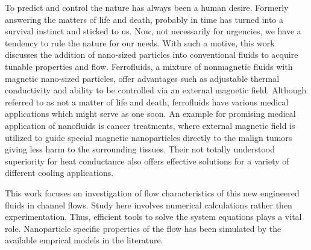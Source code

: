 
To predict and control the nature has always been a human desire. Formerly answering the matters of life and death, probably in time has turned into a survival instinct and sticked to us. Now, not necessarily for urgencies, we have a tendency to rule the nature for our needs. With such a motive, this work discusses the addition of nano-sized particles into conventional fluids to acquire tunable properties and flow. Ferrofluids, a mixture of nonmagnetic fluids with magnetic nano-sized particles, offer advantages such as adjustable thermal conductivity and ability to be controlled via an external magnetic field. Although referred to as not a matter of life and death, ferrofluids have various medical applications which might serve as one soon. An example for promising medical application of nanofluids is cancer treatments, where external magnetic field is utilized to guide special magnetic nanoparticles directly to the malign tumors giving less harm to the surrounding tissues. Their not totally understood superiority for heat conductance also offers effective solutions for a variety of different cooling applications.

This work focuses on investigation of flow characteristics of this new engineered fluids in channel flows. Study here involves numerical calculations rather then experimentation. Thus, efficient tools to solve the system equations plays a vital role. Nanoparticle specific properties of the flow has been simulated by the available emprical models in the literature. 

